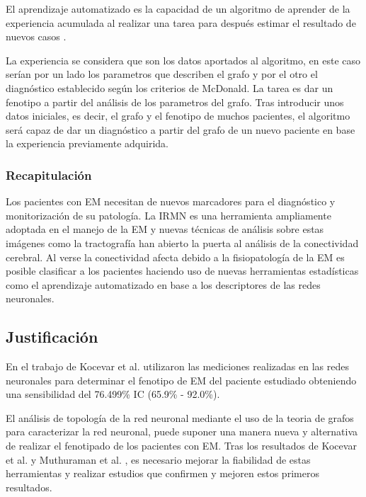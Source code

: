 \documentclass[fleqn,12pt]{UICArticle} %
\begin{document}
El aprendizaje automatizado es la capacidad de un algoritmo de aprender de la experiencia acumulada al realizar una tarea para después estimar el resultado de nuevos casos \cite{Friedman1997}.

La experiencia se considera que son los datos aportados al algoritmo, en este caso serían por un lado los parametros que describen el grafo y  por el otro el diagnóstico establecido según los criterios de McDonald. La tarea es dar un fenotipo a partir del análisis de los parametros del grafo. Tras introducir unos datos iniciales, es decir, el grafo y el fenotipo de muchos pacientes, el algoritmo será capaz de dar un diagnóstico a partir del grafo de un nuevo paciente en base la experiencia previamente adquirida.

\subsubsection{Recapitulación}

Los pacientes con EM necesitan de nuevos marcadores para el diagnóstico y monitorización de su patología. La IRMN es una herramienta ampliamente adoptada en el manejo de la EM y nuevas técnicas de análisis sobre estas imágenes como la tractografía han abierto la puerta al análisis de la conectividad cerebral. Al verse la conectividad afecta debido a la fisiopatología de la EM es posible clasificar a los pacientes haciendo uso de nuevas herramientas estadísticas como el aprendizaje automatizado en base a los descriptores de las redes neuronales.

\subsection{Justificación}

En el trabajo de Kocevar et al.\cite{Kocevar2016} utilizaron las mediciones realizadas en las redes neuronales para determinar el fenotipo de EM del paciente estudiado obteniendo una sensibilidad del 76.499\% IC (65.9\% - 92.0\%).

El análisis de topología de la red neuronal mediante el uso de la teoria de grafos para caracterizar la red neuronal, puede suponer una manera nueva y alternativa de realizar el fenotipado de los pacientes con EM. Tras los resultados de Kocevar et al.\cite{Kocevar2016} y Muthuraman et al. \cite{Muthuraman2016}, es necesario mejorar la fiabilidad de estas herramientas y realizar estudios que confirmen y mejoren estos primeros resultados.
\end{document}
